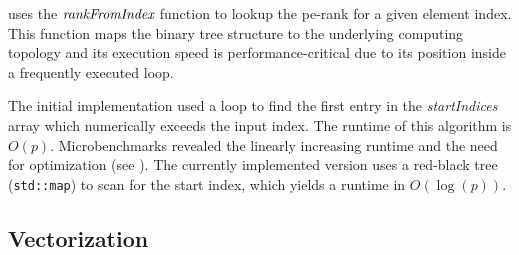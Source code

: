  uses the $\textit{rankFromIndex}$ function to lookup the \gls{pe}-rank for a given element index.
This function maps the binary tree structure to the underlying computing topology and its execution speed is performance-critical due to its position inside a frequently executed loop.

The initial implementation used a loop to find the first entry in the \textit{startIndices} array which numerically exceeds the input index.
The runtime of this algorithm is $O(p)$.
Microbenchmarks revealed the linearly increasing runtime and the need for optimization (see ).
The currently implemented version uses a red-black tree (\texttt{std::map}) to scan for the start index, which yields a runtime in $O(\log(p))$.

\newpage
\subsection{Vectorization}
\label{sec:Vectorization}


